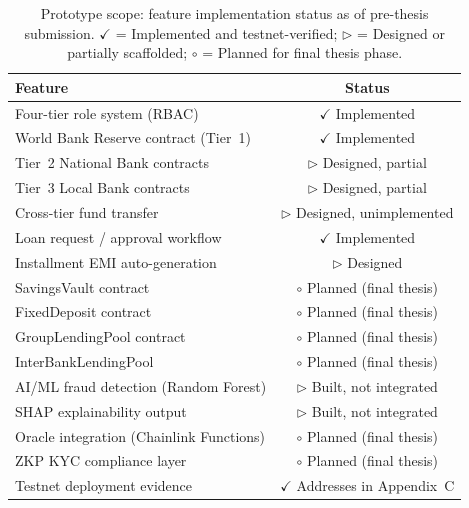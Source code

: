 \documentclass[12pt,a4paper]{report}  %
\newcommand{\tmarkDone}{\textcolor{green!55!black}{$\checkmark$}}
\newcommand{\tmarkPartial}{\textcolor{orange!85!black}{$\triangleright$}}
\newcommand{\tmarkPlanned}{\textcolor{blue!75!black}{$\circ$}}
\newcommand{\tableheadcolor}{\rowcolor{PrimaryBlue!12}}
\newcommand{\tableheadfont}{\bfseries\small\color{PrimaryBlue}}
\begin{document}
\begin{table}[H]
\centering
\setlength{\tabcolsep}{5pt}
\caption{Prototype scope: feature implementation status as of pre-thesis submission. \tmarkDone{} = Implemented and testnet-verified; \tmarkPartial{} = Designed or partially scaffolded; \tmarkPlanned{} = Planned for final thesis phase.}
\label{tab:prototype-scope}
\renewcommand{\arraystretch}{1.3}
\small
\begin{tabular}{@{}p{7.5cm}c@{}}
\toprule
\tableheadcolor
\tableheadfont Feature & \tableheadfont Status \\
\midrule
Four-tier role system (RBAC) & \tmarkDone{} Implemented \\
\rowcolor{RowShade}
World Bank Reserve contract (Tier~1) & \tmarkDone{} Implemented \\
Tier~2 National Bank contracts & \tmarkPartial{} Designed, partial \\
\rowcolor{RowShade}
Tier~3 Local Bank contracts & \tmarkPartial{} Designed, partial \\
Cross-tier fund transfer & \tmarkPartial{} Designed, unimplemented \\
\rowcolor{RowShade}
Loan request / approval workflow & \tmarkDone{} Implemented \\
Installment EMI auto-generation & \tmarkPartial{} Designed \\
\rowcolor{RowShade}
SavingsVault contract & \tmarkPlanned{} Planned (final thesis) \\
FixedDeposit contract & \tmarkPlanned{} Planned (final thesis) \\
\rowcolor{RowShade}
GroupLendingPool contract & \tmarkPlanned{} Planned (final thesis) \\
InterBankLendingPool & \tmarkPlanned{} Planned (final thesis) \\
\rowcolor{RowShade}
AI/ML fraud detection (Random Forest) & \tmarkPartial{} Built, not integrated \\
SHAP explainability output & \tmarkPartial{} Built, not integrated \\
\rowcolor{RowShade}
Oracle integration (Chainlink Functions) & \tmarkPlanned{} Planned (final thesis) \\
ZKP KYC compliance layer & \tmarkPlanned{} Planned (final thesis) \\
\rowcolor{RowShade}
Testnet deployment evidence & \tmarkDone{} Addresses in Appendix~C \\
\bottomrule
\end{tabular}
\end{table}
\end{document}
